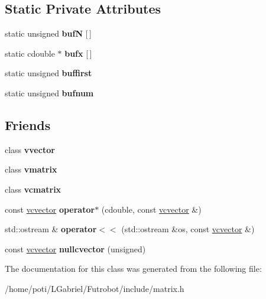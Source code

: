\subsection*{Static Private Attributes}
\begin{DoxyCompactItemize}
\item 
static unsigned {\bfseries bufN} \mbox{[}$\,$\mbox{]}\hypertarget{classvcvector_a24f0dab548a7d4bfcaeb0cf8db78fba7}{}\label{classvcvector_a24f0dab548a7d4bfcaeb0cf8db78fba7}

\item 
static cdouble $\ast$ {\bfseries bufx} \mbox{[}$\,$\mbox{]}\hypertarget{classvcvector_a2b0acbe5ba5664f12c6283a96cb67c45}{}\label{classvcvector_a2b0acbe5ba5664f12c6283a96cb67c45}

\item 
static unsigned {\bfseries buffirst}\hypertarget{classvcvector_a9d47820b930f4f914e39a590d416bd56}{}\label{classvcvector_a9d47820b930f4f914e39a590d416bd56}

\item 
static unsigned {\bfseries bufnum}\hypertarget{classvcvector_acdb858a45a0aaf3326cf158a48e69408}{}\label{classvcvector_acdb858a45a0aaf3326cf158a48e69408}

\end{DoxyCompactItemize}
\subsection*{Friends}
\begin{DoxyCompactItemize}
\item 
class {\bfseries vvector}\hypertarget{classvcvector_a15049ecbebd7aeaf58b17c60666ef8f6}{}\label{classvcvector_a15049ecbebd7aeaf58b17c60666ef8f6}

\item 
class {\bfseries vmatrix}\hypertarget{classvcvector_ac6d075ce0dd9269d283dd58eac5d8e75}{}\label{classvcvector_ac6d075ce0dd9269d283dd58eac5d8e75}

\item 
class {\bfseries vcmatrix}\hypertarget{classvcvector_a262d03e4aeb778d2fd1c2a00daa45cbc}{}\label{classvcvector_a262d03e4aeb778d2fd1c2a00daa45cbc}

\item 
const \hyperlink{classvcvector}{vcvector} {\bfseries operator$\ast$} (cdouble, const \hyperlink{classvcvector}{vcvector} \&)\hypertarget{classvcvector_a7e47a711b04289c5298b9b8a2b3e69c9}{}\label{classvcvector_a7e47a711b04289c5298b9b8a2b3e69c9}

\item 
std\+::ostream \& {\bfseries operator$<$$<$} (std\+::ostream \&os, const \hyperlink{classvcvector}{vcvector} \&)\hypertarget{classvcvector_a061d9b10fc422303d03996c2b1836010}{}\label{classvcvector_a061d9b10fc422303d03996c2b1836010}

\item 
const \hyperlink{classvcvector}{vcvector} {\bfseries nullcvector} (unsigned)\hypertarget{classvcvector_ac45e112bdc586d7e341cf49078ff536f}{}\label{classvcvector_ac45e112bdc586d7e341cf49078ff536f}

\end{DoxyCompactItemize}


The documentation for this class was generated from the following file\+:\begin{DoxyCompactItemize}
\item 
/home/poti/\+L\+Gabriel/\+Futrobot/include/matrix.\+h\end{DoxyCompactItemize}
